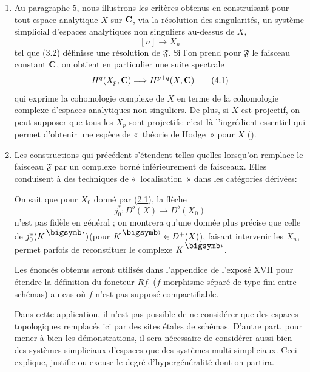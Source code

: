 \documentclass[10pt]{../fichiers-configuration-latex/smfart}
\begin{document}
\begin{enumerate}
Dans\pageoriginale le cas de « coefficients constant », des suites
spectrales analogues ont été obtenues par Segal (\cf \cite{SGA4-05bis:8}), par
d'autres méthodes et pour d'autres « théories cohomologiques »,
telles que la $K$-théorie. Segal se place dans la catégorie des
CW-complexes : il utilise un foncteur « réalisation géométrique »
qui, à un complexe semi-simplicial d'espaces topologiques, associe un
nouvel espace topologique; ce nouvel espace doit se comparer au topos
associé à un topos simplicial [\cf (1.2.12)].

\item Au paragraphe 5, nous illustrons les critères obtenus en construisant
pour tout espace analytique $X$ sur $\mathbf{C}$, via la résolution des
singularités, un système simplicial d'espaces analytiques non
singuliers au-dessus de $X$,
$$
[n] \longrightarrow X_n
$$
tel que (\hyperref[Vbis.subsec3.2]{3.2}) définisse une résolution de
$\mathfrak{F}$. Si l'on prend pour $\mathfrak{F}$ le faisceau constant
$\mathbf{C}$, on obtient en particulier une suite spectrale
\begin{equation*}
H^q(X_p, \mathbf{C}) \Longrightarrow H^{p+q}(X, \mathbf{C})\tag{4.1}
\end{equation*}
qui exprime la cohomologie complexe de $X$ en terme de la
cohomologie complexe d'espaces analytiques non singuliers. De plus,
si $X$ est projectif, on peut supposer que tous les $X_p$ sont
projectifs: c'est là l'ingrédient essentiel qui permet d'obtenir une
espèce de « théorie de Hodge » pour $X$ (\cf \cite{SGA4-05bis:2}).

\item Les constructions qui précédent s'étendent telles quelles lorsqu'on
remplace le faisceau $\mathfrak{F}$ par un complexe borné
inférieurement de faisceaux. Elles conduisent à des techniques de « localisation » dans les catégories dérivées:

On sait que pour $X_{0}$ donné par (\hyperref[Vbis.subsec2.1]{2.1}), la flèche
$$
j^{\ast}_{0} : D^b(X) \longrightarrow D^b(X_{0})
$$
n'est pas fidèle en général ; on montrera qu'une donnée plus précise
que celle de $j^{\ast}_{0}(K^{\bigdot})$\pageoriginale (pour
$K^{\bigdot} \in D^{+}(X)$), faisant intervenir les $X_n$, permet
parfois de reconstituer le complexe $K^{\bigdot}$.

Les énoncés obtenus seront utilisés dans l'appendice de l'exposé
XVII pour étendre la définition du foncteur $R f_{!}$ ($f$
morphisme séparé de type fini entre schémas) au cas où $f$ n'est
pas supposé compactifiable.

Dans cette application, il n'est pas possible de ne considérer que
des espaces topologiques remplacés ici par des sites étales de
schémas. D'autre part, pour mener à bien les démonstrations, il sera
nécessaire de considérer aussi bien des systèmes simpliciaux d'espaces
que des systèmes multi-simpliciaux. Ceci explique, justifie ou excuse
le degré d'hypergénéralité dont on partira.
\end{enumerate}
\end{document}
